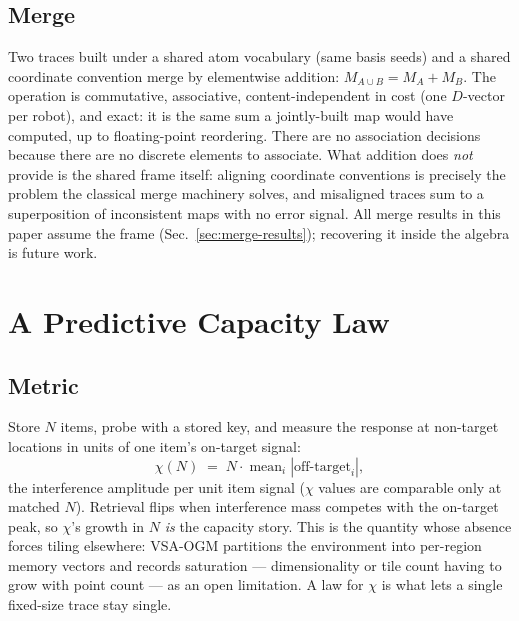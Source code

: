 \documentclass[conference]{IEEEtran}
\begin{document}
\subsection{Merge}
\label{sec:merge-method}

Two traces built under a shared atom vocabulary (same basis seeds) and a
shared coordinate convention merge by elementwise addition:
$M_{A\cup B} = M_A + M_B$. The operation is commutative, associative,
content-independent in cost (one $D$-vector per robot), and exact: it
is the same sum a jointly-built map would have computed, up to
floating-point reordering. There are no association decisions because
there are no discrete elements to associate. What addition does
\emph{not} provide is the shared frame itself: aligning coordinate
conventions is precisely the problem the classical merge machinery
solves, and misaligned traces sum to a superposition of inconsistent maps
with no error signal. All merge results in this paper assume the frame
(Sec.~\ref{sec:merge-results}); recovering it inside the algebra is
future work.

\section{A Predictive Capacity Law}
\label{sec:law}

\subsection{Metric}
Store $N$ items, probe with a stored key, and measure the response at
non-target locations in units of one item's on-target signal:
\begin{equation}
\chi(N) \;=\; N \cdot \operatorname{mean}_i \left| \text{off-target}_i \right|,
\label{eq:chi}
\end{equation}
the interference amplitude per unit item signal ($\chi$ values are
comparable only at matched $N$). Retrieval flips when interference mass
competes with the on-target peak, so $\chi$'s growth in $N$ \emph{is} the
capacity story. This is the quantity whose absence forces tiling
elsewhere: VSA-OGM \cite{snyder2026vsaogm} partitions the environment
into per-region memory vectors and records saturation --- dimensionality
or tile count having to grow with point count --- as an open limitation.
A law for $\chi$ is what lets a single fixed-size trace stay single.
\end{document}
